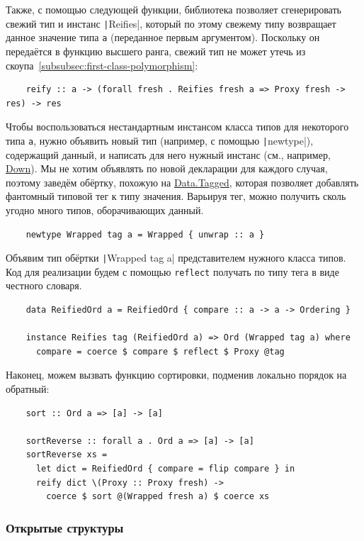 Также, с помощью следующей функции, библиотека позволяет сгенерировать свежий тип и инстанс \texttt|Reifies|, который по этому свежему типу возвращает данное значение типа \texttt{a} (переданное первым аргументом).
Поскольку он передаётся в функцию высшего ранга, свежий тип не может утечь из скоупа~\ref{subsubsec:first-class-polymorphism}:
\begin{verbatim}
    reify :: a -> (forall fresh . Reifies fresh a => Proxy fresh -> res) -> res
\end{verbatim}

Чтобы воспользоваться нестандартным инстансом класса типов для некоторого типа \texttt{a}, нужно объявить новый тип (например, с помощью \texttt|newtype|), содержащий данный, и написать для него нужный инстанс (см., например, \href{https://hackage.haskell.org/package/base-4.20.0.1/docs/Data-Ord.html#t:Down}{Down}).
Мы не хотим объявлять по новой декларации для каждого случая, поэтому заведём обёртку, похожую на \href{https://hackage.haskell.org/package/tagged-0.8.8/docs/Data-Tagged.html}{Data.Tagged}, которая позволяет добавлять фантомный типовой тег к типу значения.
Варьируя тег, можно получить сколь угодно много типов, оборачивающих данный.
\begin{verbatim}
    newtype Wrapped tag a = Wrapped { unwrap :: a }
\end{verbatim}

Объявим тип обёртки \texttt|Wrapped tag a| представителем нужного класса типов.
Код для реализации будем с помощью \texttt{reflect} получать по типу тега в виде честного словаря.
\begin{verbatim}
    data ReifiedOrd a = ReifiedOrd { compare :: a -> a -> Ordering }

    instance Reifies tag (ReifiedOrd a) => Ord (Wrapped tag a) where
      compare = coerce $ compare $ reflect $ Proxy @tag
\end{verbatim}

Наконец, можем вызвать функцию сортировки, подменив локально порядок на обратный:
\begin{verbatim}
    sort :: Ord a => [a] -> [a]

    sortReverse :: forall a . Ord a => [a] -> [a]
    sortReverse xs =
      let dict = ReifiedOrd { compare = flip compare } in
      reify dict \(Proxy :: Proxy fresh) ->
        coerce $ sort @(Wrapped fresh a) $ coerce xs
\end{verbatim}

\subsubsection{Открытые структуры} \label{subsubsec:open-structs}

